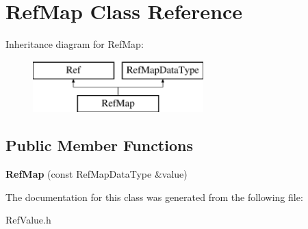 \hypertarget{class_ref_map}{}\section{Ref\+Map Class Reference}
\label{class_ref_map}
Inheritance diagram for Ref\+Map\+:\begin{figure}[H]
\begin{center}
\leavevmode
\includegraphics[height=2.000000cm]{dd/d90/class_ref_map}
\end{center}
\end{figure}
\subsection*{Public Member Functions}
\begin{DoxyCompactItemize}
\item 
\mbox{\label{class_ref_map_a74ef670524c1e740892ad757a8813b88}} 
{\bfseries Ref\+Map} (const Ref\+Map\+Data\+Type \&value)
\end{DoxyCompactItemize}


The documentation for this class was generated from the following file\+:\begin{DoxyCompactItemize}
\item 
Ref\+Value.\+h\end{DoxyCompactItemize}
